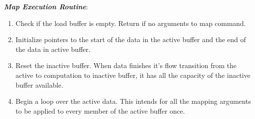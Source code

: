\textbf{\emph{Map Execution Routine}}:
\begin{enumerate}
\item Check if the load buffer is empty. Return if no arguments to map command.
\item Initialize pointers to the start of the data in the active buffer and the end of the data in active buffer.
\item Reset the inactive buffer. When data finishes it's flow transition from the active to computation to inactive buffer, it has all the capacity of the inactive buffer available.
\item Begin a loop over the active data. This intends for all the mapping arguments to be applied to every member of the active buffer once.
\end{enumerate}

